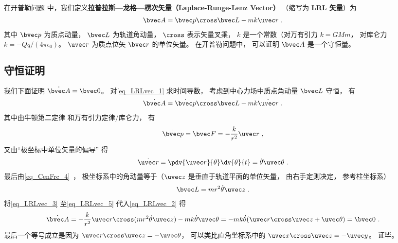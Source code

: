 

在开普勒问题%
中，我们定义\textbf{拉普拉斯—龙格—楞次矢量（Laplace-Runge-Lenz Vector）} （缩写为 \textbf{LRL 矢量}）为
\begin{equation}\label{eq_LRLvec_1}
\bvec A = \bvec p \cross \bvec L - mk \uvec r~.
\end{equation}
其中 $\bvec p$ 为质点动量， $\bvec L$ 为轨道角动量， $\cross$ 表示矢量叉乘， $k$ 是一个常数（对万有引力 $k = GMm$， 对库仑力 $k = -Qq/(4\pi\epsilon_0)$。 $\uvec r$ 为质点位矢 $\bvec r$ 的单位矢量。 在开普勒问题中， 可以证明 $\bvec A$ 是一个守恒量。

\subsection{守恒证明}
我们下面证明 $\dot{\bvec A} = \bvec 0$。 对\autoref{eq_LRLvec_1} 求时间导数， 考虑到中心力场中质点角动量 $\bvec L$ 守恒， 有
\begin{equation}\label{eq_LRLvec_2}
\dot{\bvec A} = \dot{\bvec p}\cross \bvec L  - mk\dot{\uvec r}~.
\end{equation}
其中由牛顿第二定律 和万有引力定律/库仑力， 有
\begin{equation}\label{eq_LRLvec_3}
\dot{\bvec p} = \bvec F = - \frac{k}{r^2}\uvec r~,
\end{equation}
又由“极坐标中单位矢量的偏导” 得
\begin{equation}\label{eq_LRLvec_4}
\dot{\uvec r} = \pdv{\uvec r}{\theta} \dv{\theta}{t} = \dot\theta\uvec \theta~.
\end{equation}
最后由\autoref{eq_CenFrc_4}~， 极坐标系中的角动量等于（$\uvec z$ 是垂直于轨道平面的单位矢量， 由右手定则决定， 参考柱坐标系）
\begin{equation}\label{eq_LRLvec_5}
\bvec L = mr^2\dot \theta \uvec z~.
\end{equation}
将\autoref{eq_LRLvec_3} 至\autoref{eq_LRLvec_5} 代入\autoref{eq_LRLvec_2} 得
\begin{equation}
\dot{\bvec A} = -\frac{k}{r^2}\uvec r \cross (mr^2\dot\theta\uvec z) - mk\dot\theta\uvec\theta
=-mk\dot\theta (\uvec r\cross \uvec z + \uvec \theta)
= \bvec 0~.
\end{equation}
最后一个等号成立是因为 $\uvec r\cross\uvec z = -\uvec\theta$， 可以类比直角坐标系中的 $\uvec x\cross\uvec z = -\uvec y$。 证毕。

